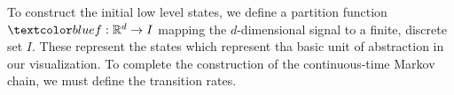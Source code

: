 


To construct the initial low level states, we define a partition function $\lstopar{f}: \mathbb{R}^d \rightarrow I$ mapping the $d$-dimensional signal to a finite, discrete set $I$. These represent the states which represent tha basic unit of abstraction in our visualization. To complete the construction of the continuous-time Markov chain, we must define the transition rates.



